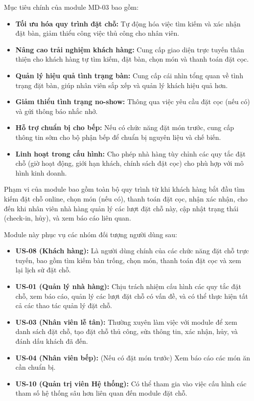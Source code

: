 \label{sssec:md03_objectives_scope}
Mục tiêu chính của module MD-03 bao gồm:
\begin{itemize}
    \item \textbf{Tối ưu hóa quy trình đặt chỗ:} Tự động hóa việc tìm kiếm và xác nhận đặt bàn, giảm thiểu công việc thủ công cho nhân viên.
    \item \textbf{Nâng cao trải nghiệm khách hàng:} Cung cấp giao diện trực tuyến thân thiện cho khách hàng tự tìm kiếm, đặt bàn, chọn món và thanh toán đặt cọc.
    \item \textbf{Quản lý hiệu quả tình trạng bàn:} Cung cấp cái nhìn tổng quan về tình trạng đặt bàn, giúp nhân viên sắp xếp và quản lý khách hiệu quả hơn.
    \item \textbf{Giảm thiểu tình trạng no-show:} Thông qua việc yêu cầu đặt cọc (nếu có) và gửi thông báo nhắc nhở.
    \item \textbf{Hỗ trợ chuẩn bị cho bếp:} Nếu có chức năng đặt món trước, cung cấp thông tin sớm cho bộ phận bếp để chuẩn bị nguyên liệu và chế biến.
    \item \textbf{Linh hoạt trong cấu hình:} Cho phép nhà hàng tùy chỉnh các quy tắc đặt chỗ (giờ hoạt động, giới hạn khách, chính sách đặt cọc) cho phù hợp với mô hình kinh doanh.
\end{itemize}
Phạm vi của module bao gồm toàn bộ quy trình từ khi khách hàng bắt đầu tìm kiếm đặt chỗ online, chọn món (nếu có), thanh toán đặt cọc, nhận xác nhận, cho đến khi nhân viên nhà hàng quản lý các lượt đặt chỗ này, cập nhật trạng thái (check-in, hủy), và xem báo cáo liên quan.

\label{sssec:md03_primary_users}
Module này phục vụ các nhóm đối tượng người dùng sau:
\begin{itemize}
    \item \textbf{US-08 (Khách hàng):} Là người dùng chính của các chức năng đặt chỗ trực tuyến, bao gồm tìm kiếm bàn trống, chọn món, thanh toán đặt cọc và xem lại lịch sử đặt chỗ.
    \item \textbf{US-01 (Quản lý nhà hàng):} Chịu trách nhiệm cấu hình các quy tắc đặt chỗ, xem báo cáo, quản lý các lượt đặt chỗ có vấn đề, và có thể thực hiện tất cả các thao tác quản lý đặt chỗ.
    \item \textbf{US-03 (Nhân viên lễ tân):} Thường xuyên làm việc với module để xem danh sách đặt chỗ, tạo đặt chỗ thủ công, sửa thông tin, xác nhận, hủy, và đánh dấu khách đã đến.
    \item \textbf{US-04 (Nhân viên bếp):} (Nếu có đặt món trước) Xem báo cáo các món ăn cần chuẩn bị.
    \item \textbf{US-10 (Quản trị viên Hệ thống):} Có thể tham gia vào việc cấu hình các tham số hệ thống sâu hơn liên quan đến module đặt chỗ.
\end{itemize}

